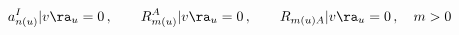 \begin{equation}
a^I_{n(u)}|v\ra_u=0\,,\qquad R_{m(u)}^A|v\ra_u=0\,,\qquad R_{m(u)A}|v\ra_u=0\,,\quad m > 0
\end{equation}

